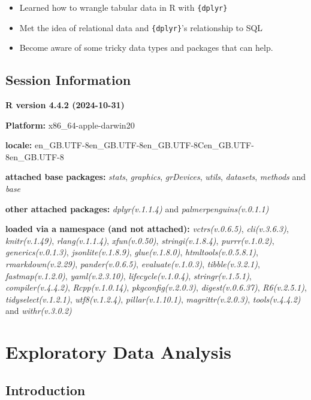 \documentclass[
  letterpaper,
  DIV=11,
  numbers=noendperiod]{scrreprt}
\begin{document}
\begin{itemize}
\item
  Learned how to wrangle tabular data in R with \texttt{\{dplyr\}}
\item
  Met the idea of relational data and \texttt{\{dplyr\}}'s relationship
  to SQL
\item
  Become aware of some tricky data types and packages that can help.
\end{itemize}

\section{Session Information}\label{session-information-6}

\textbf{R version 4.4.2 (2024-10-31)}

\textbf{Platform:} x86\_64-apple-darwin20

\textbf{locale:}
en\_GB.UTF-8\textbar\textbar en\_GB.UTF-8\textbar\textbar en\_GB.UTF-8\textbar\textbar C\textbar\textbar en\_GB.UTF-8\textbar\textbar en\_GB.UTF-8

\textbf{attached base packages:} \emph{stats}, \emph{graphics},
\emph{grDevices}, \emph{utils}, \emph{datasets}, \emph{methods} and
\emph{base}

\textbf{other attached packages:} \emph{dplyr(v.1.1.4)} and
\emph{palmerpenguins(v.0.1.1)}

\textbf{loaded via a namespace (and not attached):}
\emph{vctrs(v.0.6.5)}, \emph{cli(v.3.6.3)}, \emph{knitr(v.1.49)},
\emph{rlang(v.1.1.4)}, \emph{xfun(v.0.50)}, \emph{stringi(v.1.8.4)},
\emph{purrr(v.1.0.2)}, \emph{generics(v.0.1.3)},
\emph{jsonlite(v.1.8.9)}, \emph{glue(v.1.8.0)},
\emph{htmltools(v.0.5.8.1)}, \emph{rmarkdown(v.2.29)},
\emph{pander(v.0.6.5)}, \emph{evaluate(v.1.0.3)},
\emph{tibble(v.3.2.1)}, \emph{fastmap(v.1.2.0)}, \emph{yaml(v.2.3.10)},
\emph{lifecycle(v.1.0.4)}, \emph{stringr(v.1.5.1)},
\emph{compiler(v.4.4.2)}, \emph{Rcpp(v.1.0.14)},
\emph{pkgconfig(v.2.0.3)}, \emph{digest(v.0.6.37)}, \emph{R6(v.2.5.1)},
\emph{tidyselect(v.1.2.1)}, \emph{utf8(v.1.2.4)},
\emph{pillar(v.1.10.1)}, \emph{magrittr(v.2.0.3)}, \emph{tools(v.4.4.2)}
and \emph{withr(v.3.0.2)}

\chapter{Exploratory Data Analysis}\label{edav-analysis}

\section{Introduction}\label{introduction-3}
\end{document}
